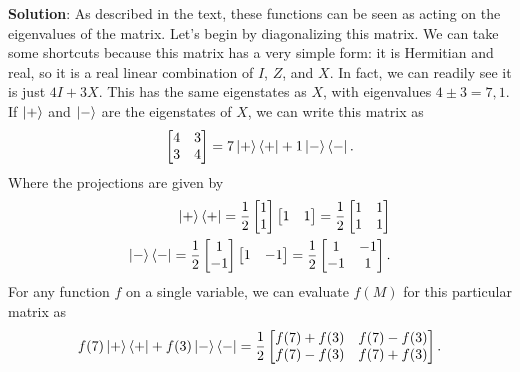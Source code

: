 \documentclass{book}
\begin{document}
    \textbf{Solution}: As described in the text, these functions can be seen as acting on the eigenvalues of the matrix. Let's begin by diagonalizing this matrix. We can take some shortcuts because this matrix has a very simple form: it is Hermitian and real, so it is a real linear combination of $I$, $Z$, and $X$. In fact, we can readily see it is just $4 I + 3 X$. This has the same eigenstates as $X$, with eigenvalues $4 \pm 3 = 7, 1$. If $\ket{+}$ and $\ket{-}$ are the eigenstates of $X$, we can write this matrix as 
    \begin{align}
        \begin{bmatrix}
            4 & 3 \\
            3 & 4
        \end{bmatrix} = 7 \ket{+}\bra{+} + 1 \ket{-}\bra{-}.
    \end{align}
    Where the projections are given by
    \begin{align}
    \begin{aligned}
        \ket{+}\bra{+} = \frac{1}{2} \begin{bmatrix}
            1 \\
            1
        \end{bmatrix} \begin{bmatrix}
            1 & 1
        \end{bmatrix} = \frac{1}{2} \begin{bmatrix}
            1 & 1 \\
            1 & 1
        \end{bmatrix} \\
        \ket{-}\bra{-} = \frac{1}{2} \begin{bmatrix}
            1 \\
            -1
        \end{bmatrix} \begin{bmatrix}
            1 & -1
        \end{bmatrix} = \frac{1}{2} \begin{bmatrix}
            1 & -1 \\
            -1 & 1
        \end{bmatrix}.
    \end{aligned}
    \end{align}
    For any function $f$ on a single variable, we can evaluate $f(M)$ for this particular matrix as 
    \begin{align}
        f(7) \ket{+}\bra{+} + f(3) \ket{-}\bra{-} = \frac{1}{2} \begin{bmatrix}
            f(7) + f(3) & f(7)-f(3) \\
            f(7)-f(3) & f(7) + f(3)
        \end{bmatrix}.
    \end{align}
\end{document}
